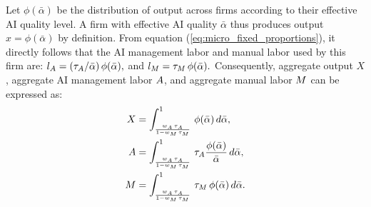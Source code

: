 Let $\phi(\bar{\alpha})$ be the distribution of output across firms according to their effective AI quality level. 
A firm with effective AI quality $\bar{\alpha}$ thus produces output $x = \phi(\bar{\alpha})$ by definition.
From equation (\ref{eq:micro_fixed_proportions}), it directly follows that the AI management labor and manual labor used by this firm are: $l_{A} = (\tau_{A}/\bar{\alpha})\,\phi(\bar{\alpha}),$ and $l_{M} = \tau_{M}\,\phi(\bar{\alpha}).$
Consequently, aggregate output $X$, aggregate AI management labor $A$, and aggregate manual labor $M$ can be expressed as:
\begin{align}
X & = \int_{\frac{w_{A}\,\tau_{A}}{1 - w_{M}\,\tau_{M}}}^{1}\,\phi(\bar{\alpha})\,d\bar{\alpha}, \label{eq:micro_X}\\
A & = \int_{\frac{w_{A}\,\tau_{A}}{1 - w_{M}\,\tau_{M}}}^{1}\,\tau_{A}\frac{\phi(\bar{\alpha})}{\bar{\alpha}}\,d\bar{\alpha}, \label{eq:micro_M}\\
M & = \int_{\frac{w_{A}\,\tau_{A}}{1 - w_{M}\,\tau_{M}}}^{1}\,\tau_{M}\,\phi(\bar{\alpha})\,d\bar{\alpha}.\label{eq:micro_H}
\end{align}

